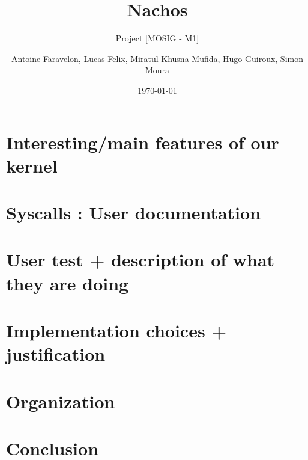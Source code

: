 \documentclass[a4paper,10pt]{article}
\title{Nachos}
\subtitle{Project [MOSIG - M1]}
\author{Antoine Faravelon, Lucas Felix, Miratul Khusna Mufida, Hugo Guiroux, Simon Moura}
\date{\today}
\begin{document}
\maketitle

\newpage
\tableofcontents
\newpage

\begin{abstract}
\end{abstract}

\section{Interesting/main features of our kernel}

\section{Syscalls : User documentation}

\section{User test + description of what they are doing}

\section{Implementation choices + justification}
    

\section{Organization}
    

\section{Conclusion}

\end{document}
